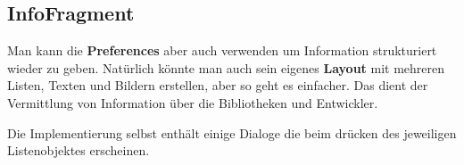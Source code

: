 \subsection{InfoFragment}

Man kann die \textbf{Preferences} aber auch verwenden um Information
strukturiert wieder zu geben. Natürlich könnte man auch sein eigenes
\textbf{Layout} mit mehreren Listen, Texten und Bildern erstellen, aber so geht
es einfacher. Das  dient der Vermittlung von Information über
die Bibliotheken und Entwickler. 

Die Implementierung selbst enthält einige Dialoge die beim drücken des
jeweiligen Listenobjektes erscheinen.	





